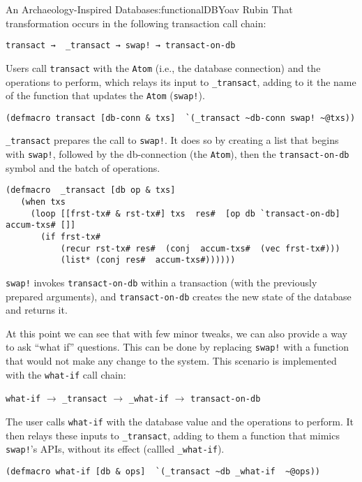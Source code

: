 \begin{aosachapter}{An Archaeology-Inspired Database}{s:functionalDB}{Yoav Rubin}
That transformation occurs in the following transaction call chain:

\begin{verbatim}
transact →  _transact → swap! → transact-on-db
\end{verbatim}

Users call \texttt{transact} with the \texttt{Atom} (i.e., the database
connection) and the operations to perform, which relays its input to
\texttt{\_transact}, adding to it the name of the function that updates
the \texttt{Atom} (\texttt{swap!}).

\begin{verbatim}
(defmacro transact [db-conn & txs]  `(_transact ~db-conn swap! ~@txs))
\end{verbatim}

\texttt{\_transact} prepares the call to \texttt{swap!}. It does so by
creating a list that begins with \texttt{swap!}, followed by the
db-connection (the \texttt{Atom}), then the \texttt{transact-on-db}
symbol and the batch of operations.

\begin{verbatim}
(defmacro  _transact [db op & txs]
   (when txs
     (loop [[frst-tx# & rst-tx#] txs  res#  [op db `transact-on-db]  accum-txs# []]
       (if frst-tx#
           (recur rst-tx# res#  (conj  accum-txs#  (vec frst-tx#)))
           (list* (conj res#  accum-txs#))))))
\end{verbatim}

\texttt{swap!} invokes \texttt{transact-on-db} within a transaction
(with the previously prepared arguments), and \texttt{transact-on-db}
creates the new state of the database and returns it.

At this point we can see that with few minor tweaks, we can also provide
a way to ask ``what if'' questions. This can be done by replacing
\texttt{swap!} with a function that would not make any change to the
system. This scenario is implemented with the \texttt{what-if} call
chain:

\texttt{what-if} $\to$ \texttt{\_transact} $\to$ \texttt{\_what-if}
$\to$ \texttt{transact-on-db}

The user calls \texttt{what-if} with the database value and the
operations to perform. It then relays these inputs to
\texttt{\_transact}, adding to them a function that mimics
\texttt{swap!}'s APIs, without its effect (callled \texttt{\_what-if}).

\begin{verbatim}
(defmacro what-if [db & ops]  `(_transact ~db _what-if  ~@ops))
\end{verbatim}


\end{aosachapter}
